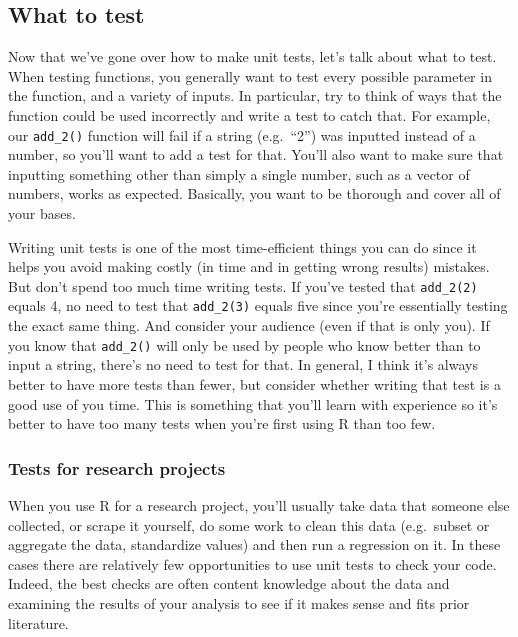 \documentclass[
]{krantz}
\begin{document}
\hypertarget{what-to-test}{%
\subsection{What to test}\label{what-to-test}}

Now that we've gone over how to make unit tests, let's talk about what to test. When testing functions, you generally want to test every possible parameter in the function, and a variety of inputs. In particular, try to think of ways that the function could be used incorrectly and write a test to catch that. For example, our \texttt{add\_2()} function will fail if a string (e.g.~``2'') was inputted instead of a number, so you'll want to add a test for that. You'll also want to make sure that inputting something other than simply a single number, such as a vector of numbers, works as expected. Basically, you want to be thorough and cover all of your bases.

Writing unit tests is one of the most time-efficient things you can do since it helps you avoid making costly (in time and in getting wrong results) mistakes. But don't spend too much time writing tests. If you've tested that \texttt{add\_2(2)} equals 4, no need to test that \texttt{add\_2(3)} equals five since you're essentially testing the exact same thing. And consider your audience (even if that is only you). If you know that \texttt{add\_2()} will only be used by people who know better than to input a string, there's no need to test for that. In general, I think it's always better to have more tests than fewer, but consider whether writing that test is a good use of you time. This is something that you'll learn with experience so it's better to have too many tests when you're first using R than too few.

\hypertarget{tests-for-research-projects}{%
\subsubsection{Tests for research projects}\label{tests-for-research-projects}}

When you use R for a research project, you'll usually take data that someone else collected, or scrape it yourself, do some work to clean this data (e.g.~subset or aggregate the data, standardize values) and then run a regression on it. In these cases there are relatively few opportunities to use unit tests to check your code. Indeed, the best checks are often content knowledge about the data and examining the results of your analysis to see if it makes sense and fits prior literature.
\end{document}

